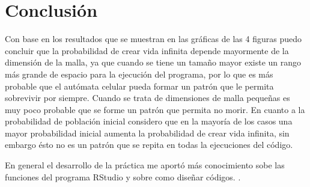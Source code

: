 \documentclass{article}
\begin{document}
\section{Conclusi\'{o}n}
Con base en los resultados que se muestran en las gráficas de las 4 figuras puedo concluir que la probabilidad de crear vida infinita depende mayormente de la dimensión de la malla, ya que cuando se tiene un tamaño mayor existe un rango más grande de espacio para la ejecución del programa, por lo que es más probable que el autómata celular pueda formar un patrón que le permita sobrevivir por siempre. Cuando se trata de dimensiones de malla pequeñas es muy poco probable que se forme un patrón que permita no morir. En cuanto a la probabilidad de población inicial considero que en la mayoría de los casos una mayor probabilidad inicial aumenta la probabilidad de crear vida infinita, sin embargo ésto no es un patrón que se repita en todas la ejecuciones del código. 

\bigskip

En general el desarrollo de la práctica me aportó más conocimiento sobe las funciones del programa RStudio y sobre como diseñar códigos.
\newpage
.
\bigskip
\bigskip



\end{document}
